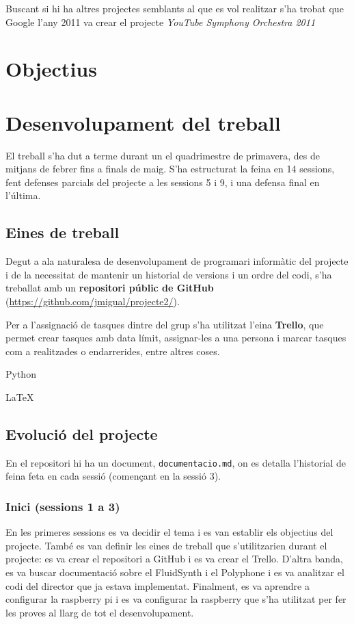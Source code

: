 \documentclass[a4paper]{article}
\begin{document}
Buscant si hi ha altres projectes semblants al que es vol realitzar s'ha trobat que Google l'any 2011 va crear el projecte \emph{YouTube Symphony Orchestra 2011}

\section{Objectius}

\section{Desenvolupament del treball}
El treball s'ha dut a terme durant un el quadrimestre de primavera, des de mitjans de febrer fins a finals de maig. S'ha estructurat la feina en 14 sessions, fent defenses parcials del projecte a les sessions 5 i 9, i una defensa final en l'última.

\subsection{Eines de treball}
Degut a ala naturalesa de desenvolupament de programari informàtic del projecte i de la necessitat de mantenir un historial de versions i un ordre del codi, s'ha treballat amb un \textbf{repositori públic de GitHub} (\url{https://github.com/jmigual/projecte2/}).

Per a l'assignació de tasques dintre del grup s'ha utilitzat l'eina \textbf{Trello}, que permet crear tasques amb data límit, assignar-les a una persona i marcar tasques com a realitzades o endarrerides, entre altres coses.

Python

\LaTeX

\subsection{Evolució del projecte}
En el repositori hi ha un document, \texttt{documentacio.md}, on es detalla l'historial de feina feta en cada sessió (començant en la sessió 3).

\subsubsection{Inici (sessions 1 a 3)}
En les primeres sessions es va decidir el tema i es van establir els objectius del projecte. També es van definir les eines de treball que s'utilitzarien durant el projecte: es va crear el repositori a GitHub i es va crear el Trello. D'altra banda, es va buscar documentació sobre el FluidSynth i el Polyphone i es va analitzar el codi del director que ja estava implementat. Finalment, es va aprendre a configurar la raspberry pi i es va configurar la raspberry que s'ha utilitzat per fer les proves al llarg de tot el desenvolupament.
\end{document}
